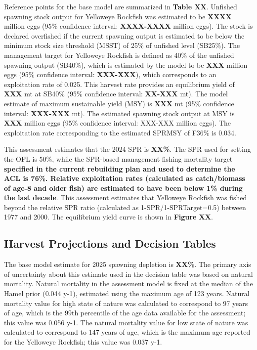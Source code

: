 \documentclass[
]{scrartcl}
\begin{document}
Reference points for the base model are summarized in \textbf{Table XX}.
Unfished spawning stock output for Yelloweye Rockfish was estimated to
be \textbf{XXXX} million eggs (95\% confidence interval:
\textbf{XXXX-XXXX} million eggs). The stock is declared overfished if
the current spawning output is estimated to be below the minimum stock
size threshold (MSST) of 25\% of unfished level (SB25\%). The management
target for Yelloweye Rockfish is defined as 40\% of the unfished
spawning output (SB40\%), which is estimated by the model to be
\textbf{XXX} million eggs (95\% confidence interval: \textbf{XXX-XXX}),
which corresponds to an exploitation rate of 0.025. This harvest rate
provides an equilibrium yield of \textbf{XXX} mt at SB40\% (95\%
confidence interval: \textbf{XX-XXX} mt). The model estimate of maximum
sustainable yield (MSY) is \textbf{XXX} mt (95\% confidence interval:
\textbf{XXX-XXX} mt). The estimated spawning stock output at MSY is
\textbf{XXX} million eggs (95\% confidence interval: XXX-XXX million
eggs). The exploitation rate corresponding to the estimated SPRMSY of
F36\% is 0.034.

This assessment estimates that the 2024 SPR is \textbf{XX\%}. The SPR
used for setting the OFL is 50\%, while the SPR-based management fishing
mortality target \textbf{specified in the current rebuilding plan and
used to determine the ACL is 76\%. Relative exploitation rates
(calculated as catch/biomass of age-8 and older fish) are estimated to
have been below 1\% during the last decade}. This assessment estimates
that Yelloweye Rockfish was fished beyond the relative SPR ratio
(calculated as 1-SPR/1-SPRTarget=0.5) between 1977 and 2000. The
equilibrium yield curve is shown in \textbf{Figure XX}.

\subsection{Harvest Projections and Decision
Tables}\label{harvest-projections-and-decision-tables}

The base model estimate for 2025 spawning depletion is \textbf{XX\%}.
The primary axis of uncertainty about this estimate used in the decision
table was based on natural mortality. Natural mortality in the
assessment model is fixed at the median of the Hamel prior (0.044 y-1),
estimated using the maximum age of 123 years. Natural mortality value
for high state of nature was calculated to correspond to 97 years of
age, which is the 99th percentile of the age data available for the
assessment; this value was 0.056 y-1. The natural mortality value for
low state of nature was calculated to correspond to 147 years of age,
which is the maximum age reported for the Yelloweye Rockfish; this value
was 0.037 y-1.
\end{document}
